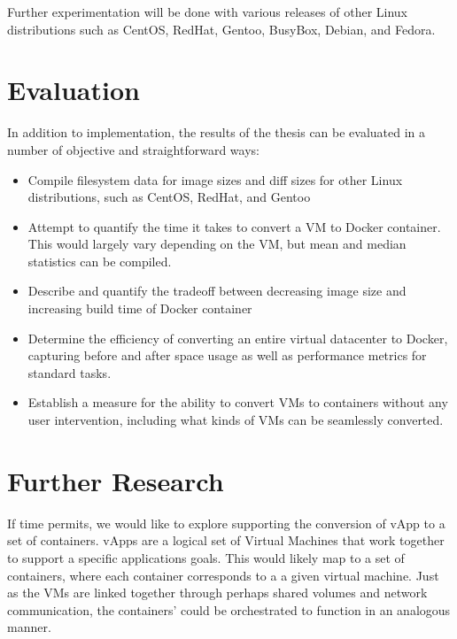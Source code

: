 \documentclass[\myfontsize, letterpaper]{article}
\begin{document}
Further experimentation will be done with various releases of other Linux distributions such as CentOS, RedHat, Gentoo, BusyBox, Debian, and Fedora.



\section{Evaluation}
\label{sec:evaluation}
In addition to implementation, the results of the thesis can be evaluated in a number of objective and straightforward ways: 
\begin{itemize}
\item Compile filesystem data for image sizes and diff sizes for other Linux distributions, such as CentOS, RedHat, and Gentoo
\item Attempt to quantify the time it takes to convert a VM to Docker container. This would largely vary depending on the VM, but mean and median statistics can be compiled.
\item Describe and quantify the tradeoff between decreasing image size and increasing build time of Docker container
\item Determine the efficiency of converting an entire virtual datacenter to Docker, capturing before and after space usage as well as performance metrics for standard tasks.
\item Establish a measure for the ability to convert VMs to containers without any user intervention, including what kinds of VMs can be seamlessly converted.
\end{itemize}

\section{Further Research}
\label{sec:futureresearch}
If time permits, we would like to explore supporting the conversion of vApp to a set of containers. vApps are a logical set of Virtual Machines that work together to support a specific applications goals. This would likely map to a set of containers, where each container corresponds to a a given virtual machine. Just as the VMs are linked together through perhaps shared volumes and network communication, the containers' could be orchestrated to function in an analogous manner.
\end{document}
